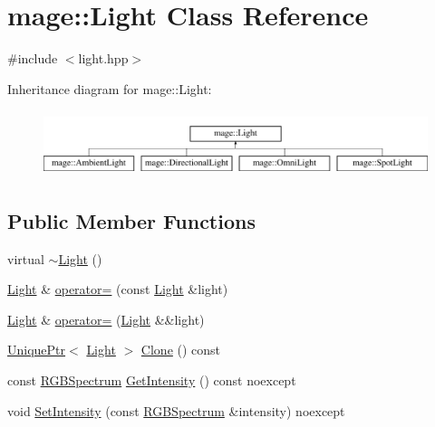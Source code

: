 \hypertarget{classmage_1_1_light}{}\section{mage\+:\+:Light Class Reference}
\label{classmage_1_1_light}


{\ttfamily \#include $<$light.\+hpp$>$}

Inheritance diagram for mage\+:\+:Light\+:\begin{figure}[H]
\begin{center}
\leavevmode
\includegraphics[height=1.944445cm]{classmage_1_1_light}
\end{center}
\end{figure}
\subsection*{Public Member Functions}
\begin{DoxyCompactItemize}
\item 
virtual \hyperlink{classmage_1_1_light_af877bc473dede83689a4bda8a36d4d36}{$\sim$\+Light} ()
\item 
\hyperlink{classmage_1_1_light}{Light} \& \hyperlink{classmage_1_1_light_ad1267c8d162e2cdead5e3a7d83cef3c1}{operator=} (const \hyperlink{classmage_1_1_light}{Light} \&light)
\item 
\hyperlink{classmage_1_1_light}{Light} \& \hyperlink{classmage_1_1_light_a5fd2edc3fcbcc1dbe7a2620b76cedd25}{operator=} (\hyperlink{classmage_1_1_light}{Light} \&\&light)
\item 
\hyperlink{namespacemage_a8c307fbcc33bce9b7f2aa4c26c3b95cf}{Unique\+Ptr}$<$ \hyperlink{classmage_1_1_light}{Light} $>$ \hyperlink{classmage_1_1_light_a4c87e4a361b20519c49b4a0397625a6a}{Clone} () const
\item 
const \hyperlink{structmage_1_1_r_g_b_spectrum}{R\+G\+B\+Spectrum} \hyperlink{classmage_1_1_light_ad4ffb4c5fa06812e7d523a69b177d55a}{Get\+Intensity} () const noexcept
\item 
void \hyperlink{classmage_1_1_light_ab7312aee7c5f7b4b564e27592e1b4223}{Set\+Intensity} (const \hyperlink{structmage_1_1_r_g_b_spectrum}{R\+G\+B\+Spectrum} \&intensity) noexcept
\end{DoxyCompactItemize}
